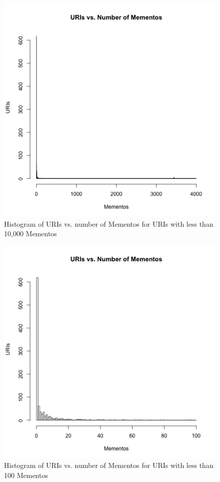 \documentclass[letterpaper,11pt]{article}
\begin{document}
\begin{figure}
\includegraphics[scale=0.7]{work/q2/q2-histogram2.png}
\caption{Histogram of URIs vs. number of Mementos for URIs with less than 10,000 Mementos}
\label{fig:q2histy2}
\end{figure}

\begin{figure}
\includegraphics[scale=0.7]{work/q2/q2-histogram3.png}
\caption{Histogram of URIs vs. number of Mementos for URIs with less than 100 Mementos}
\label{fig:q2histy3}
\end{figure}
\end{document}
